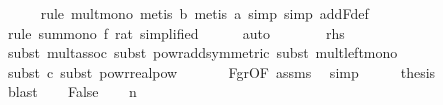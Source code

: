 \begin{isabellebody}
\ \ \ \ \isamarkupfalse%
\ {\isacharparenleft}{\kern0pt}rule\ mult{\isacharunderscore}{\kern0pt}mono{\isacharcomma}{\kern0pt}\ metis\ b{\isacharcomma}{\kern0pt}\ metis\ a{\isacharcomma}{\kern0pt}\ simp{\isacharcomma}{\kern0pt}\ simp\ add{\isacharcolon}{\kern0pt}F{\isacharunderscore}{\kern0pt}def{\isacharparenright}{\kern0pt}\isanewline
\ \ \ \ \isamarkupfalse%
\ {\isacharparenleft}{\kern0pt}rule\ sum{\isacharunderscore}{\kern0pt}mono{\isacharbrackleft}{\kern0pt}\ f{\isacharequal}{\kern0pt}{\isachardoublequoteopen}{\isasymlambda}{\isacharunderscore}{\kern0pt}{\isachardot}{\kern0pt}\ {\isacharparenleft}{\kern0pt}{}{\isacharcolon}{\kern0pt}{\isacharcolon}{\kern0pt}rat{\isacharparenright}{\kern0pt}{\isachardoublequoteclose}{\isacharcomma}{\kern0pt}\ simplified{\isacharbrackright}{\kern0pt}{\isacharparenright}{\kern0pt}\isanewline
\ \ \ \ \isamarkupfalse%
\ auto\isanewline
\ \ \isamarkupfalse%
\ \isamarkupfalse%
\ {\isachardoublequoteopen}{\isachardot}{\kern0pt}{\isachardot}{\kern0pt}{\isachardot}{\kern0pt}\ {\isasymle}\ {\isacharquery}{\kern0pt}rhs{\isachardoublequoteclose}\isanewline
\ \ \ \ \isamarkupfalse%
\ {\isacharparenleft}{\kern0pt}subst\ mult{\isachardot}{\kern0pt}assoc{\isacharcomma}{\kern0pt}\ subst\ powr{\isacharunderscore}{\kern0pt}add{\isacharbrackleft}{\kern0pt}symmetric{\isacharbrackright}{\kern0pt}{\isacharcomma}{\kern0pt}\ subst\ mult{\isacharunderscore}{\kern0pt}left{\isacharunderscore}{\kern0pt}mono{\isacharparenright}{\kern0pt}\isanewline
\ \ \ \ \isamarkupfalse%
\ {\isacharparenleft}{\kern0pt}subst\ c{\isacharcomma}{\kern0pt}\ subst\ powr{\isacharunderscore}{\kern0pt}realpow{\isacharparenright}{\kern0pt}\isanewline
\ \ \ \ \isamarkupfalse%
\ \ F{\isacharunderscore}{\kern0pt}gr{\isacharunderscore}{\kern0pt}{}{\isacharbrackleft}{\kern0pt}OF\ assms{\isacharparenleft}{\kern0pt}{}{\isacharparenright}{\kern0pt}{\isacharbrackright}{\kern0pt}\ \isamarkupfalse%
\ simp{\isacharplus}{\kern0pt}\isanewline
\ \ \isamarkupfalse%
\ \isamarkupfalse%
\ {\isacharquery}{\kern0pt}thesis\isanewline
\ \ \ \ \isamarkupfalse%
\ blast\isanewline
{}\isamarkupfalse%
\isanewline
\ \ \isamarkupfalse%
\ False\isanewline
\ \ \isamarkupfalse%
\ {\isachardoublequoteopen}n\ {\isachargreater}{\kern0pt}\ {}{\isachardoublequoteclose}\ \isanewline
\ \ \ \ \isamarkupfalse%

\end{isabellebody}
